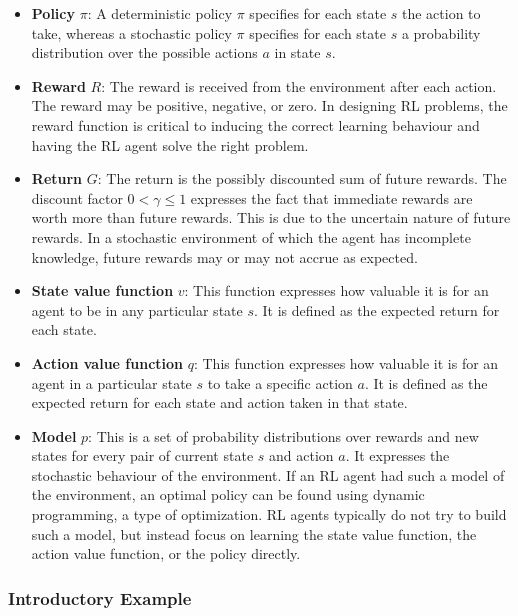 \begin{itemize}
    \item \textbf{Policy} $\pi$: A deterministic policy $\pi$ specifies for each state $s$ the action to take, whereas a stochastic policy $\pi$ specifies for each state $s$  a probability distribution over the possible actions $a$ in state $s$.
    \item \textbf{Reward} $R$: The reward is received from the environment after each action. The reward may be positive, negative, or zero. In designing RL problems, the reward function is critical to inducing the correct learning behaviour and having the RL agent solve the right problem. 
    \item \textbf{Return} $G$: The return is the possibly discounted sum of future rewards. The discount factor $0 < \gamma \leq 1$ expresses the fact that immediate rewards are worth more than future rewards. This is due to the uncertain nature of future rewards. In a stochastic environment of which the agent has incomplete knowledge, future rewards may or may not accrue as expected.
    \item \textbf{State value function} $v$: This function expresses how valuable it is for an agent to be in any particular state $s$. It is defined as the expected return for each state.
    \item \textbf{Action value function} $q$: This function expresses how valuable it is for an agent in a particular state $s$ to take a specific action $a$. It is defined as the expected return for each state and action taken in that state.
    \item \textbf{Model} $p$: This is a set of probability distributions over rewards and new states for every pair of current state $s$ and action $a$. It expresses the stochastic behaviour of the environment. If an RL agent had such a model of the environment, an optimal policy can be found using dynamic programming, a type of optimization. RL agents typically do not try to build such a model, but instead focus on learning the state value function, the action value function, or the policy directly.
\end{itemize}

\subsubsection*{Introductory Example}

